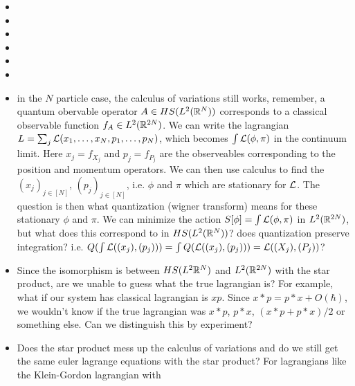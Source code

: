 \documentclass{book}
\begin{document}
	\begin{itemize}
		\item {}
		\item {}
		\item {}
		\item {}
		\item {}
		\item {}
		\item in the $N$ particle case, the calculus of variations still works, remember, a quantum obervable operator $A \in HS(L^2(\mathbb{R}^N))$ corresponds to a classical observable function $f_A \in L^2(\mathbb{R}^{2N})$. We can write the lagrangian $L = \sum_{j} \mathcal{L}(x_1, \ldots, x_N, p_1, \ldots, p_N)$, which becomes $\int \mathcal{L}(\phi, \pi)$ in the continuum limit. Here $x_j = f_{X_j}$ and $p_j = f_{P_j}$ are the observeables corresponding to the position and momentum operators. We can then use calculus to find the $(x_j)_{j \in [N]}$, $(p_j)_{j \in [N]}$, i.e. $\phi$ and $\pi$ which are stationary for $\mathcal{L}$.    
		The question is then what quantization (wigner transform) means for these stationary $\phi$ and $\pi$. We can minimize the action $S[\phi] = \int \mathcal{L}(\phi, \pi)$ in $L^2(\mathbb{R}^{2N})$, but what does this correspond to in $HS(L^2(\mathbb{R}^N))$? does quantization preserve integration? i.e. $Q(\int \mathcal{L}((x_j), (p_j))) = \int Q(\mathcal{L}((x_j), (p_j))) = \mathcal{L}((X_j), (P_j))$? 
		\item Since the isomorphism is between $HS(L^2\mathbb{R}^N)$ and $L^2(\mathbb{R}^{2N})$ with the star product, are we unable to guess what the true lagrangian is? For example, what if our system has classical lagrangian is $xp$. Since $x*p = p*x + O(\hbar)$, we wouldn't know if the true lagrangian was $x*p$, $p*x$, $(x*p + p*x)/2$ or something else. Can we distinguish this by experiment? 
		\item Does the star product mess up the calculus of variations and do we still get the same euler lagrange equations with the star product? For lagrangians like the Klein-Gordon lagrangian with 
	\end{itemize}
	
\end{document}
